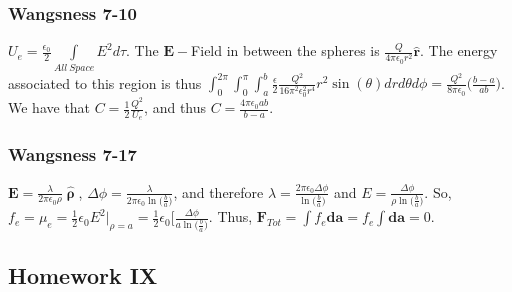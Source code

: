 \documentclass[crop=false,class=article,oneside]{standalone}
\begin{document}
        \subsubsection{Wangsness 7-10}
            $U_e = \frac{\epsilon_0}{2} \underset{All\ Space}\int E^2 d\tau$.
            The $\mathbf{E}-$Field in between the spheres is
            $\frac{Q}{4\pi \epsilon_0 r^2}\hat{\mathbf{r}}$.
            The energy associated to this region is thus
            $\int_{0}^{2\pi}\int_{0}^{\pi}\int_{a}^{b} \frac{\epsilon}{2} \frac{Q^2}{16\pi^2 \epsilon_0^2 r^4}r^2\sin(\theta) dr d\theta d\phi = \frac{Q^2}{8\pi \epsilon_0}\bigg(\frac{b-a}{ab}\bigg)$.
            We have that $C = \frac{1}{2} \frac{Q^2}{U_e}$, and thus $C=\frac{4\pi \epsilon_0 ab}{b-a}$.
        \subsubsection{Wangsness 7-17}
            $\mathbf{E} = \frac{\lambda}{2\pi\epsilon_0\rho}\hat{\boldsymbol{\uprho}}$,
            $\Delta\phi = \frac{\lambda}{2\pi \epsilon_0 \ln\big(\frac{b}{a}\big)}$,
            and therefore $\lambda=\frac{2\pi \epsilon_0 \Delta\phi}{\ln\big(\frac{b}{a}\big)}$
            and $E = \frac{\Delta \phi}{\rho \ln\big(\frac{b}{a}\big)}$.
            So, $f_e = \mu_e = \frac{1}{2} \epsilon_0 E^2\bigg|_{\rho = a} = \frac{1}{2} \epsilon_0 \bigg[ \frac{\Delta\phi}{a \ln\big(\frac{b}{a}\big)}$.
            Thus, $\mathbf{F}_{Tot} = \int f_e \mathbf{da} = f_e \int \mathbf{da} = 0$.
    \subsection{Homework IX}
\end{document}
